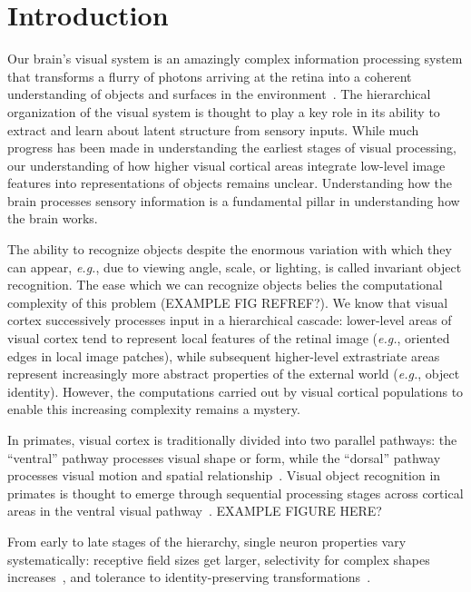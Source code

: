 \chapter{Introduction}
\label{introduction}

Our brain's visual system is an amazingly complex information processing system that transforms a flurry of photons arriving at the retina into a coherent understanding of objects and surfaces in the environment~\cite{DiCarlo2007, Cox2014}. The hierarchical organization of the visual system is thought to play a key role in its ability to extract and learn about latent structure from sensory inputs. While much progress has been made in understanding the earliest stages of visual processing, our understanding of how higher visual cortical areas integrate low-level image features into representations of objects remains unclear. Understanding how the brain processes sensory information is a fundamental pillar in understanding how the brain works. 

The ability to recognize objects despite the enormous variation with which they can appear, \textit{e.g.}, due to viewing angle, scale, or lighting, is called invariant object recognition. The ease which we can recognize objects belies the computational complexity of this problem (EXAMPLE FIG REFREF?). We know that visual cortex successively processes input in a hierarchical cascade: lower-level areas of visual cortex tend to represent local features of the retinal image (\textit{e.g.}, oriented edges in local image patches), while subsequent higher-level extrastriate areas represent increasingly more abstract properties of the external world (\textit{e.g.}, object identity). However, the computations carried out by visual cortical populations to enable this increasing complexity remains a mystery.

In primates, visual cortex is traditionally divided into two parallel pathways: the “ventral” pathway processes visual shape or form, while the “dorsal” pathway processes visual motion and spatial relationship~\cite{REFREF}. Visual object recognition in primates is thought to emerge through sequential processing stages across cortical areas in the ventral visual pathway~\cite{Rust2010SelectivityIT, DiCarlo2007, DiCarlo2012, Chen2014}.  EXAMPLE FIGURE HERE?

From early to late stages of the hierarchy, single neuron properties vary systematically:  receptive field sizes get larger, selectivity for complex shapes increases~\cite{Desimone1984, Logothetis1996}, and tolerance to identity-preserving transformations~\cite{REFREF}. 

